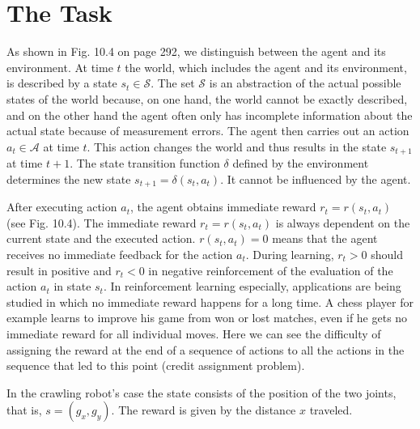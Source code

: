 \documentclass[10pt]{book}
\begin{document}
\section{The Task}
As shown in Fig. 10.4 on page 292, we distinguish between the agent and its environment. At time $t$ the world, which includes the agent and its environment, is described by a state $s_{t} \in \mathcal{S}$. The set $\mathcal{S}$ is an abstraction of the actual possible states of the world because, on one hand, the world cannot be exactly described, and on the other hand the agent often only has incomplete information about the actual state because of measurement errors. The agent then carries out an action $a_{t} \in \mathcal{A}$ at time $t$. This action changes the world and thus results in the state $s_{t+1}$ at time $t+1$. The state transition function $\delta$ defined by the environment determines the new state $s_{t+1}=\delta\left(s_{t}, a_{t}\right)$. It cannot be influenced by the agent.

After executing action $a_{t}$, the agent obtains immediate reward $r_{t}=r\left(s_{t}, a_{t}\right)$ (see Fig. 10.4). The immediate reward $r_{t}=r\left(s_{t}, a_{t}\right)$ is always dependent on the current state and the executed action. $r\left(s_{t}, a_{t}\right)=0$ means that the agent receives no immediate feedback for the action $a_{t}$. During learning, $r_{t}>0$ should result in positive and $r_{t}<0$ in negative reinforcement of the evaluation of the action $a_{t}$ in state $s_{t}$. In reinforcement learning especially, applications are being studied in which no immediate reward happens for a long time. A chess player for example learns to improve his game from won or lost matches, even if he gets no immediate reward for all individual moves. Here we can see the difficulty of assigning the reward at the end of a sequence of actions to all the actions in the sequence that led to this point (credit assignment problem).

In the crawling robot's case the state consists of the position of the two joints, that is, $s=\left(g_{x}, g_{y}\right)$. The reward is given by the distance $x$ traveled.
\end{document}
